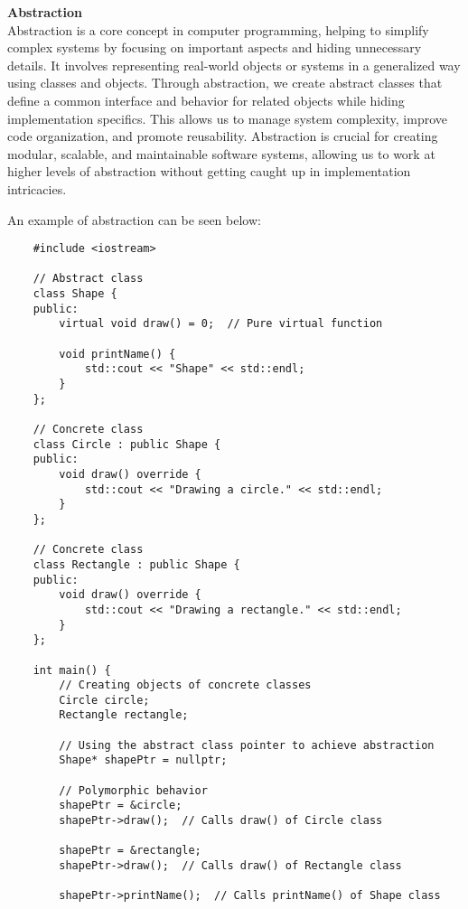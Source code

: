 \noindent \textbf{Abstraction} \\

Abstraction is a core concept in computer programming, helping to simplify complex systems by focusing on important aspects and hiding unnecessary details. It involves representing real-world objects or systems in a generalized 
way using classes and objects. Through abstraction, we create abstract classes that define a common interface and behavior for related objects while hiding implementation specifics. This allows us to manage system complexity, 
improve code organization, and promote reusability. Abstraction is crucial for creating modular, scalable, and maintainable software systems, allowing us to work at higher levels of abstraction without getting caught up in implementation intricacies.

\begin{solution}
    An example of abstraction can be seen below: \\
    \horizontalline
    \begin{verbatim}
    #include <iostream>

    // Abstract class
    class Shape {
    public:
        virtual void draw() = 0;  // Pure virtual function
        
        void printName() {
            std::cout << "Shape" << std::endl;
        }
    };

    // Concrete class
    class Circle : public Shape {
    public:
        void draw() override {
            std::cout << "Drawing a circle." << std::endl;
        }
    };

    // Concrete class
    class Rectangle : public Shape {
    public:
        void draw() override {
            std::cout << "Drawing a rectangle." << std::endl;
        }
    };

    int main() {
        // Creating objects of concrete classes
        Circle circle;
        Rectangle rectangle;
        
        // Using the abstract class pointer to achieve abstraction
        Shape* shapePtr = nullptr;
        
        // Polymorphic behavior
        shapePtr = &circle;
        shapePtr->draw();  // Calls draw() of Circle class
        
        shapePtr = &rectangle;
        shapePtr->draw();  // Calls draw() of Rectangle class
        
        shapePtr->printName();  // Calls printName() of Shape class
        

\end{verbatim}
\end{solution}
